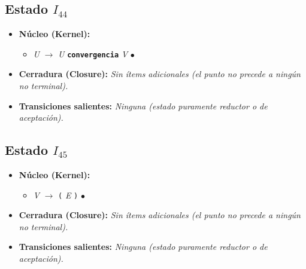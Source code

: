 \documentclass[12pt, letterpaper]{article}
\begin{document}
\subsection*{Estado $I_{44}$ }
\begin{itemize}\setlength{\itemsep}{1pt}\setlength{\parskip}{0pt}
\item \textbf{Núcleo (Kernel):}
\begin{itemize}\setlength{\itemsep}{1pt}\setlength{\parskip}{0pt}
    \item \textit{U} $\to$ \textit{U} \textbf{\texttt{convergencia}} \textit{V} $\bullet$ 
\end{itemize}
\item \textbf{Cerradura (Closure):} \emph{Sin ítems adicionales (el punto no precede a ningún no terminal).}
\item \textbf{Transiciones salientes:} \emph{Ninguna (estado puramente reductor o de aceptación).}
\end{itemize}
\vspace{2pt}
\subsection*{Estado $I_{45}$ }
\begin{itemize}\setlength{\itemsep}{1pt}\setlength{\parskip}{0pt}
\item \textbf{Núcleo (Kernel):}
\begin{itemize}\setlength{\itemsep}{1pt}\setlength{\parskip}{0pt}
    \item \textit{V} $\to$ \texttt{(} \textit{E} \texttt{)} $\bullet$ 
\end{itemize}
\item \textbf{Cerradura (Closure):} \emph{Sin ítems adicionales (el punto no precede a ningún no terminal).}
\item \textbf{Transiciones salientes:} \emph{Ninguna (estado puramente reductor o de aceptación).}
\end{itemize}
\vspace{2pt}
\end{document}
